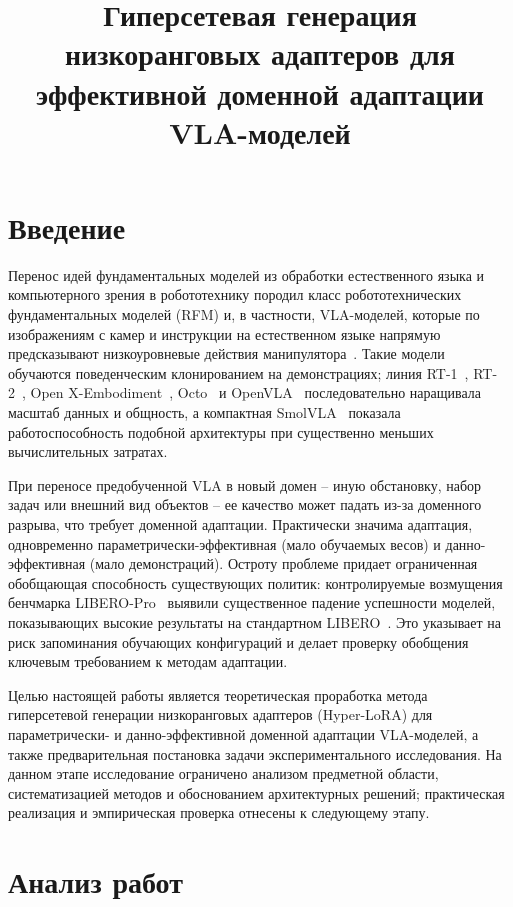 \documentclass{misisarticle}
\title{Гиперсетевая генерация низкоранговых адаптеров для эффективной доменной адаптации VLA-моделей}
\begin{document}
\maketitle

\section{Введение}

Перенос идей фундаментальных моделей из обработки естественного языка и компьютерного зрения в робототехнику породил класс робототехнических фундаментальных моделей (RFM) и, в частности, VLA-моделей, которые по изображениям с камер и инструкции на естественном языке напрямую предсказывают низкоуровневые действия манипулятора~\cite{firoozi2023}. Такие модели обучаются поведенческим клонированием на демонстрациях; линия RT-1~\cite{rt1}, RT-2~\cite{rt2}, Open X-Embodiment~\cite{oxe}, Octo~\cite{octo} и OpenVLA~\cite{openvla} последовательно наращивала масштаб данных и общность, а компактная SmolVLA~\cite{smolvla} показала работоспособность подобной архитектуры при существенно меньших вычислительных затратах.

При переносе предобученной VLA в новый домен -- иную обстановку, набор задач или внешний вид объектов -- ее качество может падать из-за доменного разрыва, что требует доменной адаптации. Практически значима адаптация, одновременно параметрически-эффективная (мало обучаемых весов) и данно-эффективная (мало демонстраций). Остроту проблеме придает ограниченная обобщающая способность существующих политик: контролируемые возмущения бенчмарка LIBERO-Pro~\cite{liberopro} выявили существенное падение успешности моделей, показывающих высокие результаты на стандартном LIBERO~\cite{libero}. Это указывает на риск запоминания обучающих конфигураций и делает проверку обобщения ключевым требованием к методам адаптации.

Целью настоящей работы является теоретическая проработка метода гиперсетевой генерации низкоранговых адаптеров (Hyper-LoRA) для параметрически- и данно-эффективной доменной адаптации VLA-моделей, а также предварительная постановка задачи экспериментального исследования. На данном этапе исследование ограничено анализом предметной области, систематизацией методов и обоснованием архитектурных решений; практическая реализация и эмпирическая проверка отнесены к следующему этапу.

\section{Анализ работ}
\end{document}

